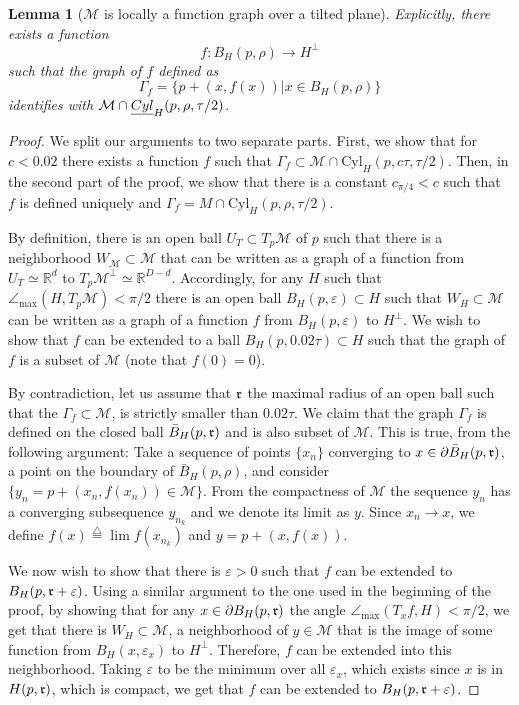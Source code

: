 \documentclass[12pt]{article}
\newtheorem{Lemma}[Theorem]{Lemma}
\theoremstyle{remark}
\newcommand{\RR}{\mathbb{R}}
\newcommand{\MM}{\mathcal{M}}
\newcommand{\eps}{\varepsilon}
\newcommand{\defeq}{\stackrel{\bigtriangleup}{=}}
\newcommand{\maxangle}{\angle_{\max}}
\begin{document}
\begin{appendices}
\begin{Lemma} [$\MM$ is locally a function graph over a tilted plane]
\noindent Explicitly, there exists a function 
$$
f:B_H(p, \rho) \to H^\perp
$$
such that the graph of $f$ defined as
$$
\Gamma_f = \{p + (x,f(x)) | x\in B_H(p, \rho) \} 
$$
identifies with $\MM \cap \emph{Cyl}_H(p,\rho, \tau/2)$.
\end{Lemma}
\begin{proof}
We split our arguments to two separate parts.
First, we show that for $c < 0.02$ there exists a function $f$ such that $\Gamma_f \subset \MM\cap \textrm{Cyl}_H(p,  c \tau, \tau/2)$.
Then, in the second part of the proof, we show that there is a constant $c_{\pi/4} < c$ such that $f$ is defined uniquely and $\Gamma_f = M\cap \textrm{Cyl}_H(p, \rho, \tau/2)$.

By definition, there is an open ball $U_T\subset T_p\MM$ of $p$ such that there is a neighborhood $W_\MM \subset \MM$ that can be written as a graph of a function from $U_T\simeq \RR^d$ to $T_p\MM^\perp\simeq \RR^{D-d}$.
Accordingly, for any $H$ such that $\maxangle(H, T_p\MM) < \pi/2$ there is an open ball $B_H(p,\eps) \subset H$ such that $W_H \subset \MM$ can be written as a graph of a function $f$  from $B_H(p,\eps)$ to $H^\perp$.
We wish to show that $f$ can be extended to a ball $B_H(p, 0.02 \tau)\subset H$ such that the graph of $f$ is a subset of $\MM$ (note that $f(0) = 0$).

By contradiction, let us assume that $\frak{r}$ the maximal radius of an open ball such that the $\Gamma_f \subset \MM$, is strictly smaller than $0.02 \tau$.
We claim that the graph $\Gamma_f$ is defined on the closed ball $\bar B_H(p, \frak{r})$ and is also subset of $\MM$.
This is true, from the following argument:
Take a sequence of points $\{x_n\}$ converging to $ x\in \partial \bar B_H(p, \frak{r})$, a point on the boundary of $\bar B_H(p, \rho)$, and consider $\{y_n = p + (x_n, f(x_n))\in \MM\}$. From the compactness of $\MM$ the sequence $y_n$ has a converging subsequence $y_{n_k}$ and we denote its limit as $y$.
Since $x_n \to x$, we define $f(x)\defeq\lim f(x_{n_k})$ and  $y = p + (x, f(x))$.

We now wish to show that there is $\eps>0$ such that $f$ can be extended to $B_H(p, \frak{r} + \eps)$.
Using a similar argument to the one used in the beginning of the proof, by showing that for any $x\in\partial B_H(p, \frak{r})$ the angle $\maxangle(T_x f, H) < \pi/2$, we get that there is $W_H\subset\MM$, a neighborhood of $y\in \MM$ that is the image of some function from $B_H(x,\eps_x)$ to $H^\perp$.
Therefore, $f$ can be extended into this neighborhood.
Taking $\eps$ to be the minimum over all $\eps_x$, which exists since $x$ is in $H(p, \frak{r})$, which is compact, we get that $f$ can be extended to $B_H(p, \frak{r}+ \eps)$.


\end{proof}
\end{appendices}
\end{document}
